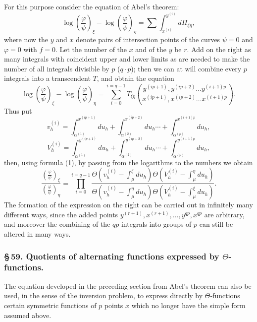 \documentclass[10pt]{article}
\begin{document}
For this purpose consider the equation of Abel's theorem:
\[
\log\left(\frac{\varphi}{\psi}\right)_{\xi}-\log\left(\frac{\varphi}{\psi}\right)_{\eta}
=\sum\int_{x^{(i)}}^{y^{(i)}}d\Pi_{\xi\eta},
\]
where now the \(y\) and \(x\) denote pairs of intersection points of the curves \(\psi=0\) and \(\varphi=0\) with \(f=0\). Let the number of the \(x\) and of the \(y\) be \(r\). Add on the right as many integrals with coincident upper and lower limits as are needed to make the number of all integrals divisible by \(p\) (\(q\cdot p\)); then we can at will combine every \(p\) integrals into a transcendent \(T\), and obtain the equation
\[
\log\left(\frac{\varphi}{\psi}\right)_{\xi}-\log\left(\frac{\varphi}{\psi}\right)_{\eta}
=\sum_{i=0}^{i=q-1}
T_{\xi\eta}\binom{y^{(ip+1)},y^{(ip+2)}\ldots y^{(i+1)p}}
{x^{(ip+1)},x^{(ip+2)}\ldots x^{(i+1)p}}.
\]
Thus put
\[
v_h^{(i)}=\int_{\alpha^{(1)}}^{x^{(ip+1)}}du_h+\int_{\alpha^{(2)}}^{x^{(ip+2)}}du_h\cdots+\int_{\alpha^{(p)}}^{x^{(i+1)p}}du_h,
\]
\[
V_h^{(i)}=\int_{\alpha^{(1)}}^{y^{(ip+1)}}du_h+\int_{\alpha^{(2)}}^{y^{(ip+2)}}du_h\cdots+\int_{\alpha^{(p)}}^{y^{(i+1)p}}du_h,
\]
then, using formula (1), by passing from the logarithms to the numbers we obtain
\[
\frac{\left(\frac{\varphi}{\psi}\right)_{\xi}}
{\left(\frac{\varphi}{\psi}\right)_{\eta}}
=
\prod_{i=0}^{i=q-1}
\frac{
\Theta\!\left(v_h^{(i)}-\int_{\mu}^{\xi}du_h\right)
\Theta\!\left(V_h^{(i)}-\int_{\mu}^{\eta}du_h\right)}
{\Theta\!\left(v_h^{(i)}-\int_{\mu}^{\eta}du_h\right)
\Theta\!\left(V_h^{(i)}-\int_{\mu}^{\xi}du_h\right)}.
\]
The formation of the expression on the right can be carried out in infinitely many different ways, since the added points \(y^{(r+1)},x^{(r+1)},\ldots,y^{q p},x^{q p}\) are arbitrary, and moreover the combining of the \(q p\) integrals into groups of \(p\) can still be altered in many ways.

\subsubsection*{\S\,59. Quotients of alternating functions expressed by \(\Theta\)-functions.}

The equation developed in the preceding section from Abel's theorem can also be used, in the sense of the inversion problem, to express directly by \(\Theta\)-functions certain symmetric functions of \(p\) points \(x\) which no longer have the simple form assumed above.
\end{document}
